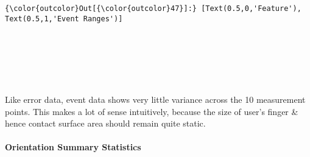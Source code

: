 \documentclass[11pt]{article}
\begin{document}
\begin{Verbatim}[commandchars=\\\{\}]
{\color{outcolor}Out[{\color{outcolor}47}]:} [Text(0.5,0,'Feature'), Text(0.5,1,'Event Ranges')]
\end{Verbatim}
            
    \begin{center}
    \end{center}
    { \hspace*{\fill} \\}
    
    \begin{center}
    \end{center}
    { \hspace*{\fill} \\}
    
    \begin{center}
    \end{center}
    { \hspace*{\fill} \\}
    
    Like error data, event data shows very little variance across the 10
measurement points. This makes a lot of sense intuitively, because the
size of user's finger \& hence contact surface area should remain quite
static.

    \hypertarget{orientation-summary-statistics}{%
\paragraph{Orientation Summary
Statistics}\label{orientation-summary-statistics}}
\end{document}
